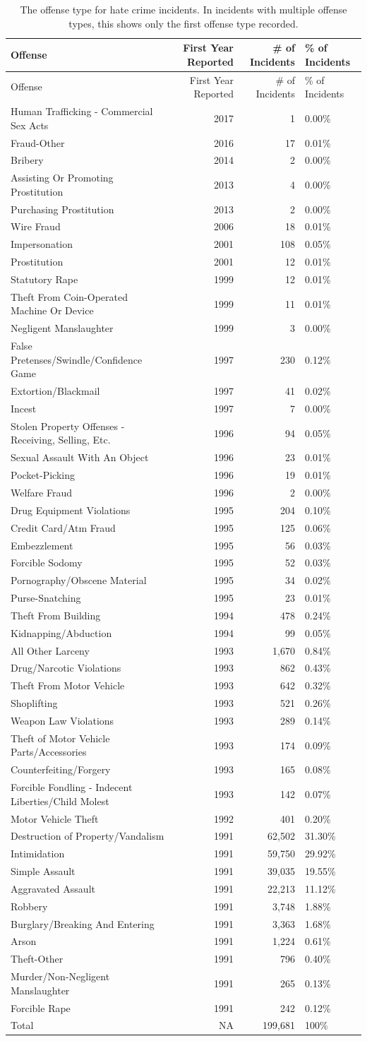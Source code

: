 \documentclass[
  12pt,
  openany]{book}
\begin{document}
\begin{longtable}[]{@{}lrrl@{}}
\caption{\label{tab:hateOffense}The offense type for hate crime incidents. In incidents with multiple offense types, this shows only the first offense type recorded.}\tabularnewline
\toprule
Offense & First Year Reported & \# of Incidents & \% of Incidents\tabularnewline
\midrule
\endfirsthead
\toprule
Offense & First Year Reported & \# of Incidents & \% of Incidents\tabularnewline
\midrule
\endhead
Human Trafficking - Commercial Sex Acts & 2017 & 1 & 0.00\%\tabularnewline
Fraud-Other & 2016 & 17 & 0.01\%\tabularnewline
Bribery & 2014 & 2 & 0.00\%\tabularnewline
Assisting Or Promoting Prostitution & 2013 & 4 & 0.00\%\tabularnewline
Purchasing Prostitution & 2013 & 2 & 0.00\%\tabularnewline
Wire Fraud & 2006 & 18 & 0.01\%\tabularnewline
Impersonation & 2001 & 108 & 0.05\%\tabularnewline
Prostitution & 2001 & 12 & 0.01\%\tabularnewline
Statutory Rape & 1999 & 12 & 0.01\%\tabularnewline
Theft From Coin-Operated Machine Or Device & 1999 & 11 & 0.01\%\tabularnewline
Negligent Manslaughter & 1999 & 3 & 0.00\%\tabularnewline
False Pretenses/Swindle/Confidence Game & 1997 & 230 & 0.12\%\tabularnewline
Extortion/Blackmail & 1997 & 41 & 0.02\%\tabularnewline
Incest & 1997 & 7 & 0.00\%\tabularnewline
Stolen Property Offenses - Receiving, Selling, Etc. & 1996 & 94 & 0.05\%\tabularnewline
Sexual Assault With An Object & 1996 & 23 & 0.01\%\tabularnewline
Pocket-Picking & 1996 & 19 & 0.01\%\tabularnewline
Welfare Fraud & 1996 & 2 & 0.00\%\tabularnewline
Drug Equipment Violations & 1995 & 204 & 0.10\%\tabularnewline
Credit Card/Atm Fraud & 1995 & 125 & 0.06\%\tabularnewline
Embezzlement & 1995 & 56 & 0.03\%\tabularnewline
Forcible Sodomy & 1995 & 52 & 0.03\%\tabularnewline
Pornography/Obscene Material & 1995 & 34 & 0.02\%\tabularnewline
Purse-Snatching & 1995 & 23 & 0.01\%\tabularnewline
Theft From Building & 1994 & 478 & 0.24\%\tabularnewline
Kidnapping/Abduction & 1994 & 99 & 0.05\%\tabularnewline
All Other Larceny & 1993 & 1,670 & 0.84\%\tabularnewline
Drug/Narcotic Violations & 1993 & 862 & 0.43\%\tabularnewline
Theft From Motor Vehicle & 1993 & 642 & 0.32\%\tabularnewline
Shoplifting & 1993 & 521 & 0.26\%\tabularnewline
Weapon Law Violations & 1993 & 289 & 0.14\%\tabularnewline
Theft of Motor Vehicle Parts/Accessories & 1993 & 174 & 0.09\%\tabularnewline
Counterfeiting/Forgery & 1993 & 165 & 0.08\%\tabularnewline
Forcible Fondling - Indecent Liberties/Child Molest & 1993 & 142 & 0.07\%\tabularnewline
Motor Vehicle Theft & 1992 & 401 & 0.20\%\tabularnewline
Destruction of Property/Vandalism & 1991 & 62,502 & 31.30\%\tabularnewline
Intimidation & 1991 & 59,750 & 29.92\%\tabularnewline
Simple Assault & 1991 & 39,035 & 19.55\%\tabularnewline
Aggravated Assault & 1991 & 22,213 & 11.12\%\tabularnewline
Robbery & 1991 & 3,748 & 1.88\%\tabularnewline
Burglary/Breaking And Entering & 1991 & 3,363 & 1.68\%\tabularnewline
Arson & 1991 & 1,224 & 0.61\%\tabularnewline
Theft-Other & 1991 & 796 & 0.40\%\tabularnewline
Murder/Non-Negligent Manslaughter & 1991 & 265 & 0.13\%\tabularnewline
Forcible Rape & 1991 & 242 & 0.12\%\tabularnewline
Total & NA & 199,681 & 100\%\tabularnewline
\bottomrule
\end{longtable}
\end{document}
